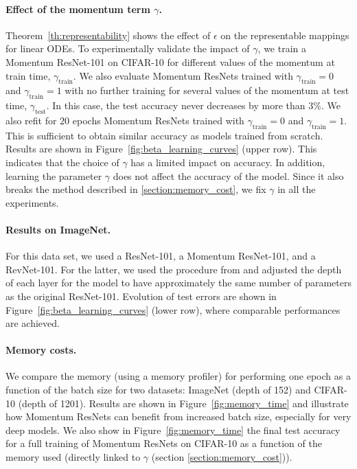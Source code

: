 \documentclass{article}
\begin{document}
\paragraph{Effect of the momentum term $\gamma$.}

Theorem~\ref{th:representability} shows the effect of $\epsilon$ on the representable mappings for linear ODEs.
To experimentally validate the impact of $\gamma$, we train a Momentum ResNet-101 on CIFAR-10 for different values of the momentum at train time, $\gamma_{\mathrm{train}}$. We also evaluate Momentum ResNets trained with $\gamma_{\mathrm{train}} = 0$ and $\gamma_{\mathrm{train}} =1$ with no further training for several values of the momentum at test time, $\gamma_{\mathrm{test}}$. In this case, the test accuracy never decreases by more than $3 \%$.  We also refit for $20$ epochs Momentum ResNets trained with $\gamma_{\mathrm{train}} = 0$ and $\gamma_{\mathrm{train}} =1$. This is sufficient to obtain similar accuracy as models trained from scratch. Results are shown in Figure~\ref{fig:beta_learning_curves} (upper row). This indicates that the choice of $\gamma$ has a limited impact on accuracy.  In addition, learning the parameter $\gamma$ does not affect the accuracy of the model. Since it also breaks the method described in \ref{section:memory_cost}, we fix $\gamma$ in all the experiments.



\paragraph{Results on ImageNet.}
For this data set, we used a ResNet-101, a Momentum ResNet-101, and a RevNet-101. For the latter, we used the procedure from \citet{gomez2017reversible} and adjusted the depth of each layer for the model to have approximately the same number of parameters as the original ResNet-101. Evolution of test errors are shown in Figure~\ref{fig:beta_learning_curves} (lower row), where comparable performances are achieved.
\vspace{-0.5em}
\paragraph{Memory costs.}
We compare the memory (using a memory profiler) for performing one epoch as a function of the batch size for two datasets: ImageNet (depth of 152) and CIFAR-10 (depth of 1201). Results are shown in Figure~\ref{fig:memory_time} and illustrate how Momentum ResNets can benefit from increased batch size, especially for very deep models. We also show in Figure~\ref{fig:memory_time} the final test accuracy for a full training of Momentum ResNets on CIFAR-10 as a function of the memory used (directly linked to $\gamma$ (section \ref{section:memory_cost})).
\end{document}
